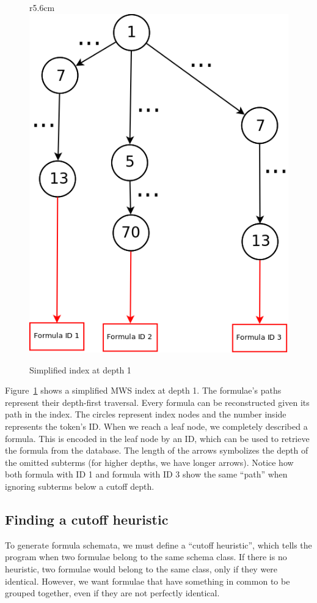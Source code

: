 \documentclass[a4paper,oneside]{article}
\def\MWS{\textsf{MWS}\xspace}
\begin{document}
\begin{figure}r{5.6cm}\vspace*{-1em}
    \includegraphics[scale=0.24]{img/FFG_Algo_diag.png}
\caption{Simplified index at depth 1}\label{fig:algoindex}
\end{figure}

Figure~\ref{fig:algoindex} shows a simplified \MWS index at depth 1.
The formulae's paths represent their depth-first traversal.
Every formula can be reconstructed given its path in the index.
The circles represent index nodes and the number inside represents
the token's ID. When we reach a leaf node, we completely described a
formula. This is encoded in the leaf node by an ID, which can be used
to retrieve the formula from the database.
The length of the arrows symbolizes the depth of the omitted subterms
(for higher depths, we have longer arrows).
Notice how both formula with ID 1 and formula with ID 3 show the same
``path'' when ignoring subterms below a cutoff depth.

\subsection{Finding a cutoff heuristic}\label{subsec:cutoffheur}
To generate formula schemata, we must define a ``cutoff heuristic'',
which tells the program when two formulae belong to the same schema class.
If there is no heuristic, two formulae would belong to the same class,
only if they were identical. However, we want formulae that have something in
common to be grouped together, even if they are not perfectly identical.
\end{document}
